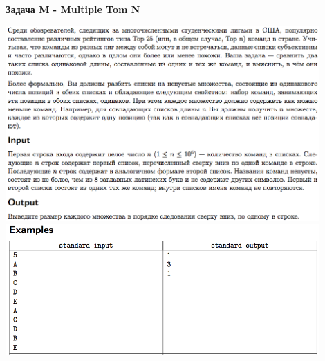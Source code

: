 \documentclass[a4paper,12pt]{article}
\begin{document}
\newpage
\textbf{{\large Задача M - Multiple Tom N}} \\
\begin{center}
\includegraphics[width=0.9\textwidth]{OC_America/OC_America_M1.png}\\ [1cm]
\includegraphics[width=0.9\textwidth]{OC_America/OC_America_M2.png}\\ [1cm]
\end{center}
\newpage
\end{document}
